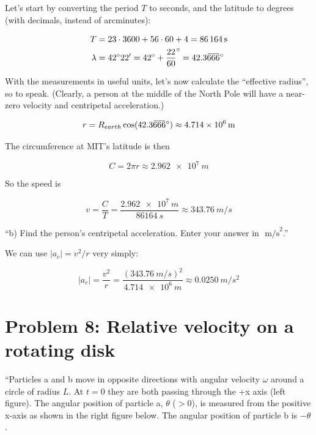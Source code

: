 \documentclass[12pt,a4paper]{report}
\newcommand{\overbar}[1]{\mkern 1.5mu\overline{\mkern-1.5mu#1\mkern-1.5mu}\mkern 1.5mu}
\begin{document}
Let's start by converting the period $T$ to seconds, and the latitude to degrees (with decimals, instead of arcminutes):

\begin{align}
T &= 23 \cdot 3600 + 56 \cdot 60 + 4 = \SI{86164}{s}\\
\lambda &= \ang{42;22;} = \ang{42} + \frac{22}{60}^\circ = 42.3\overbar{666}^\circ
\end{align}

With the measurements in useful units, let's now calculate the ``effective radius'', so to speak. (Clearly, a person at the middle of the North Pole will have a near-zero velocity and centripetal acceleration.)

\begin{equation}
r = R_{earth} \cos(42.3\overbar{666}^\circ) \approx \SI{4.714e6}{m}
\end{equation}

The circumference at MIT's latitude is then

\begin{equation}
C = 2 \pi r \approx \SI{2.962e7}{m}
\end{equation}

So the speed is

\begin{equation}
v = \frac{C}{T} = \frac{\SI{2.962e7}{m}}{\SI{86164}{s}} \approx \SI{343.76}{m/s}
\end{equation}

``b) Find the person's centripetal acceleration. Enter your answer in $\text{ m/s}^2$.''

We can use $|a_c| = v^2/r$ very simply:

\begin{equation}
|a_c| = \frac{v^2}{r} = \frac{(\SI{343.76}{m/s})^2}{\SI{4.714e6}{m}} \approx \SI{0.0250}{m/s^2}
\end{equation}

\section{Problem 8: Relative velocity on a rotating disk}

``Particles a and b move in opposite directions with angular velocity $\omega$ around a circle of radius $L$. At $t = 0$ they are both passing through the +x axis (left figure). The angular position of particle a, $\theta$ ($>0$), is measured from the positive x-axis as shown in the right figure below. The angular position of particle b is $-\theta$.
\end{document}
